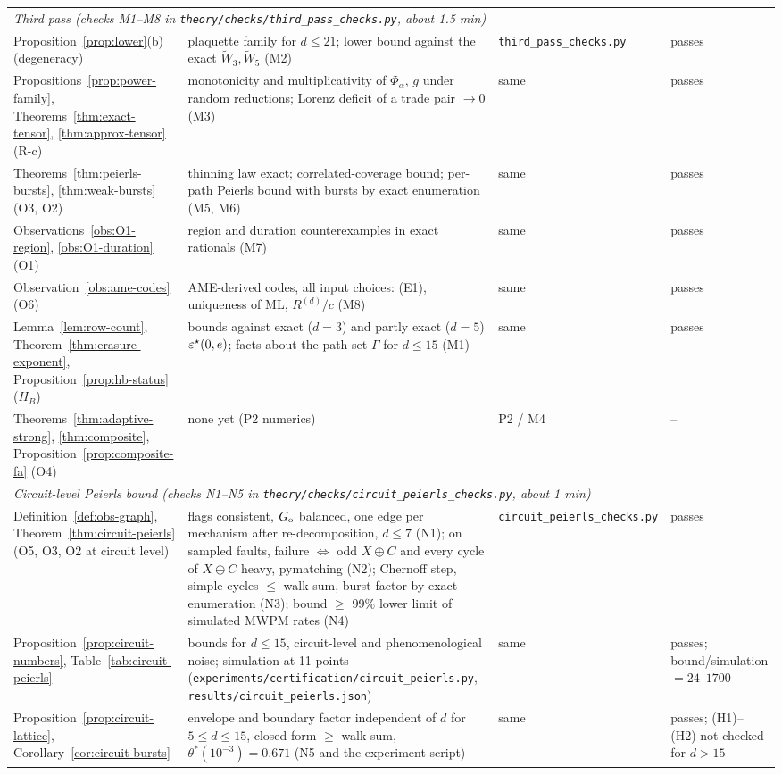 {\begin{longtable}{p{3.7cm} p{4.5cm} p{3.2cm} p{2.6cm}}
\multicolumn{4}{l}{\emph{Third pass (checks M1--M8 in \texttt{theory/checks/third\_pass\_checks.py}, about 1.5 min)}} \\
Proposition~\ref{prop:lower}(b) (degeneracy) & plaquette family for $d\le21$; lower bound against the exact $\widetilde W_3,\widetilde W_5$ (M2) & \texttt{third\_pass\_checks.py} & passes \\
Propositions~\ref{prop:power-family}, Theorems~\ref{thm:exact-tensor}, \ref{thm:approx-tensor} (R-c) & monotonicity and multiplicativity of $\Phi_\alpha$, $g$ under random reductions; Lorenz deficit of a trade pair $\to0$ (M3) & same & passes \\
Theorems~\ref{thm:peierls-bursts}, \ref{thm:weak-bursts} (O3, O2) & thinning law exact; correlated-coverage bound; per-path Peierls bound with bursts by exact enumeration (M5, M6) & same & passes \\
Observations~\ref{obs:O1-region}, \ref{obs:O1-duration} (O1) & region and duration counterexamples in exact rationals (M7) & same & passes \\
Observation~\ref{obs:ame-codes} (O6) & AME-derived codes, all input choices: (E1), uniqueness of ML, $R^{(d)}/c$ (M8) & same & passes \\
Lemma~\ref{lem:row-count}, Theorem~\ref{thm:erasure-exponent}, Proposition~\ref{prop:hb-status} ($H_B$) & bounds against exact ($d=3$) and partly exact ($d=5$) $\varepsilon^{\star}(0,e)$; facts about the path set $\Gamma$ for $d\le15$ (M1) & same & passes \\
Theorems~\ref{thm:adaptive-strong}, \ref{thm:composite}, Proposition~\ref{prop:composite-fa} (O4) & none yet (P2 numerics) & P2 / M4 & -- \\
\multicolumn{4}{l}{\emph{Circuit-level Peierls bound (checks N1--N5 in \texttt{theory/checks/circuit\_peierls\_checks.py}, about 1 min)}} \\
Definition~\ref{def:obs-graph}, Theorem~\ref{thm:circuit-peierls} (O5, O3, O2 at circuit level) & flags consistent, $G_{\rm o}$ balanced, one edge per mechanism after re-decomposition, $d\le7$ (N1); on sampled faults, failure $\Leftrightarrow$ odd $X\oplus C$ and every cycle of $X\oplus C$ heavy, pymatching (N2); Chernoff step, simple cycles $\le$ walk sum, burst factor by exact enumeration (N3); bound $\ge$ 99\% lower limit of simulated MWPM rates (N4) & \texttt{circuit\_peierls\_checks.py} & passes \\
Proposition~\ref{prop:circuit-numbers}, Table~\ref{tab:circuit-peierls} & bounds for $d\le15$, circuit-level and phenomenological noise; simulation at 11 points (\texttt{experiments/certification/circuit\_peierls.py}, \texttt{results/circuit\_peierls.json}) & same & passes; bound/simulation $=24$--$1700$ \\
Proposition~\ref{prop:circuit-lattice}, Corollary~\ref{cor:circuit-bursts} & envelope and boundary factor independent of $d$ for $5\le d\le15$, closed form $\ge$ walk sum, $\theta^\ast(10^{-3})=0.671$ (N5 and the experiment script) & same & passes; (H1)--(H2) not checked for $d>15$ \\
\bottomrule
\end{longtable}
}

